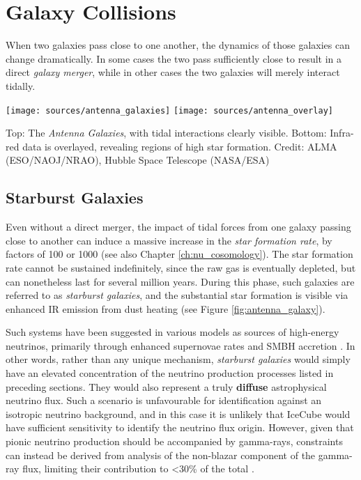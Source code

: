 \section{Galaxy Collisions}

When two galaxies pass close to one another, the dynamics of those galaxies can change dramatically. In some cases the two pass sufficiently close to result in a direct \emph{galaxy merger}, while in other cases the two galaxies will merely interact tidally.

\begin{marginfigure}
	\texttt{[image: sources/antenna\_galaxies]}
	\texttt{[image: sources/antenna\_overlay]}
	\caption{Top: The \emph{Antenna Galaxies}, with tidal interactions clearly visible. Bottom: Infra-red data is overlayed, revealing regions of high star formation. Credit: ALMA (ESO/NAOJ/NRAO), Hubble Space Telescope (NASA/ESA)}
	\label{fig:antenna_galaxy}
\end{marginfigure}

\subsection*{Starburst Galaxies}
Even without a direct merger, the impact of tidal forces from one galaxy passing close to another can induce a massive increase in the \emph{star formation rate}, by factors of 100 or 1000 (see also Chapter \ref{ch:nu_cosomology}). The star formation rate cannot be sustained indefinitely, since the raw gas is eventually depleted, but can nonetheless last for several million years. During this phase, such galaxies are referred to as \emph{starburst galaxies}, and the substantial star formation is visible via enhanced IR emission from dust heating (see Figure \ref{fig:antenna_galaxy}).

Such systems have been suggested in various models as sources of high-energy neutrinos, primarily through enhanced supernovae rates and SMBH accretion . In other words,  rather than any unique mechanism, \emph{starburst galaxies} would simply have an elevated concentration of the neutrino production processes listed in preceding sections. They would also represent a truly \textbf{diffuse} astrophysical neutrino flux. Such a scenario is unfavourable for identification against an isotropic neutrino background, and in this case it is unlikely that IceCube would have sufficient sensitivity to identify the neutrino flux origin. However, given that pionic neutrino production should be accompanied by gamma-rays, constraints can instead be derived from analysis of the non-blazar component of the gamma-ray flux, limiting their contribution to <30\% of the total .


